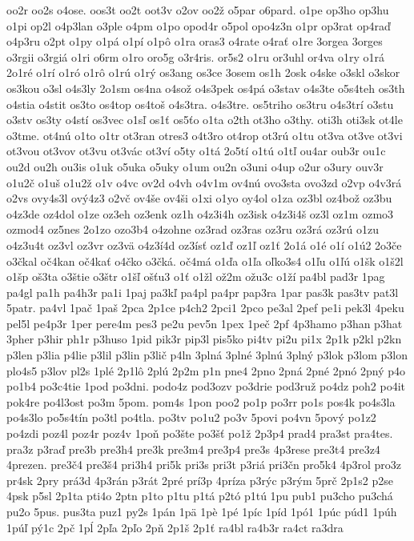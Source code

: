 {oo2r
oo2s
o4ose.
oos3t
oo2t
oot3v
o2ov
oo2ž
o5par
o6pard.
o1pe
op3ho
op3hu
o1pi
op2l
o4p3lan
o3ple
o4pm
o1po
opod4r
o5pol
opo4z3n
o1pr
op3rat
op4raď
o4p3ru
o2pt
o1py
o1pá
o1pí
o1pô
o1ra
oras3
o4rate
o4rať
o1re
3orgea
3orges
o3rgii
o3rgiá
o1ri
o6rm
o1ro
oro5g
o3r4ris.
or5s2
o1ru
or3uhl
or4va
o1ry
o1rá
2o1ré
o1rí
o1ró
o1rô
o1rú
o1rý
os3ang
os3ce
3osem
os1h
2osk
o4ske
o3skl
o3skor
os3kou
o3sl
o4s3ly
2o1sm
os4na
o4sož
o4s3pek
os4pá
o3stav
o4s3te
o5s4teh
os3th
o4stia
o4stit
os3to
os4top
os4toš
o4s3tra.
o4s3tre.
os5triho
os3tru
o4s3trí
o3stu
o3stv
os3ty
o4stí
os3vec
o1sľ
os1ť
os5ťo
o1ta
o2th
ot3ho
o3thy.
oti3h
oti3sk
ot4le
o3tme.
ot4nú
o1to
o1tr
ot3ran
otres3
o4t3ro
ot4rop
ot3rú
o1tu
ot3va
ot3ve
ot3vi
ot3vou
ot3vov
ot3vu
ot3vác
ot3ví
o5ty
o1tá
2o5tí
o1tú
o1tľ
ou4ar
oub3r
ou1c
ou2d
ou2h
ou3is
o1uk
o5uka
o5uky
o1um
ou2n
o3uni
o4up
o2ur
o3ury
ouv3r
o1u2č
o1uš
o1u2ž
o1v
o4vc
ov2d
o4vh
o4v1m
ov4nú
ovo3sta
ovo3zd
o2vp
o4v3rá
o2vs
ovy4s3l
ový4z3
o2vč
ov4še
ov4ši
o1xi
o1yo
oy4ol
o1za
oz3bl
oz4bož
oz3bu
o4z3de
oz4dol
o1ze
oz3eh
oz3enk
oz1h
o4z3i4h
oz3isk
o4z3i4š
oz3l
oz1m
ozmo3
ozmod4
oz5nes
2o1zo
ozo3b4
o4zohne
oz3rad
oz3ras
oz3ru
oz3rá
oz3rú
o1zu
o4z3u4t
oz3vl
oz3vr
oz3vä
o4z3í4d
oz3ísť
oz1ď
oz1ľ
oz1ť
2o1á
o1é
o1í
o1ú2
2o3če
o3čkal
oč4kan
oč4kať
o4čko
o3čká.
oč4má
o1ďa
o1ľa
oľko3s4
o1ľu
o1ľú
o1šk
o1š2l
o1šp
oš3ta
o3štie
o3štr
o1šľ
ošťu3
o1ť
o1žl
ož2m
ožu3c
o1ží
pa4bl
pad3r
1pag
pa4gl
pa1h
pa4h3r
pa1i
1paj
pa3kľ
pa4pl
pa4pr
pap3ra
1par
pas3k
pas3tv
pat3l
5patr.
pa4vl
1pač
1paš
2pca
2p1ce
p4ch2
2pci1
2pco
pe3al
2pef
pe1i
pek3l
4peku
pel5l
pe4p3r
1per
pere4m
pes3
pe2u
pev5n
1pex
1peč
2pf
4p3hamo
p3han
p3hat
3pher
p3hir
ph1r
p3huso
1pid
pik3r
pip3l
pis5ko
pi4tv
pi2u
pi1x
2p1k
p2kl
p2kn
p3len
p3lia
p4lie
p3lil
p3lin
p3lič
p4ln
3plná
3plné
3plnú
3plný
p3lok
p3lom
p3lon
plo4s5
p3lov
pl2s
1plé
2p1lô
2plú
2p2m
p1n
pne4
2pno
2pná
2pné
2pnó
2pný
p4o
po1b4
po3c4tie
1pod
po3dni.
podo4z
pod3ozv
po3drie
pod3ruž
po4dz
poh2
po4it
pok4re
po4l3ost
po3m
5pom.
pom4s
1pon
poo2
po1p
po3rr
po1s
pos4k
po4s3la
po4s3lo
po5s4tín
po3tl
po4tla.
po3tv
po1u2
po3v
5povi
po4vn
5pový
po1z2
po4zdi
poz4l
poz4r
poz4v
1poň
po3šte
po3šť
po1ž
2p3p4
prad4
pra3st
pra4tes.
pra3z
p3raď
pre3b
pre3h4
pre3k
pre3m4
pre3p4
pre3s
4p3rese
pre3t4
pre3z4
4prezen.
pre3č4
pre3š4
pri3h4
pri5k
pri3s
pri3t
p3riá
pri3čn
pro5k4
4p3rol
pro3z
pr4sk
2pry
prá3d
4p3rán
p3rát
2pré
prí3p
4príza
p3rýc
p3rým
5prč
2p1s2
p2se
4psk
p5sl
2p1ta
pti4o
2ptn
p1to
p1tu
p1tá
p2tó
p1tú
1pu
pub1
pu3cho
pu3chá
pu2o
5pus.
pus3ta
puz1
py2s
1pán
1pä
1pè
1pé
1píc
1píd
1pó1
1púc
púd1
1púh
1púľ
pý1c
2pč
1pĺ
2pľa
2pľo
2pň
2p1š
2p1ť
ra4bl
ra4b3r
ra4ct
ra3dra
}
